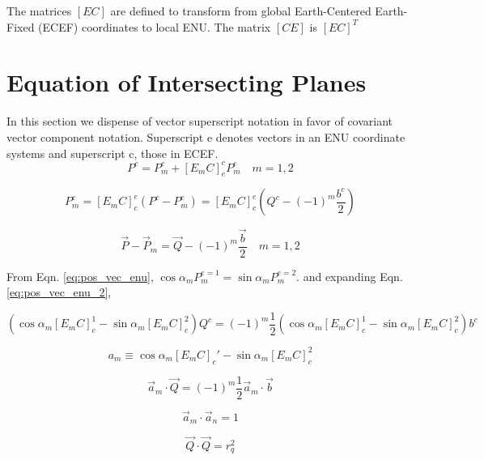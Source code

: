 \documentclass[12pt]{article}
\begin{document}
	The matrices $[EC]$ are defined to transform from global Earth-Centered Earth-Fixed (ECEF) coordinates to local
	ENU. The matrix $[CE]$ is $[EC]^T$
	
	\section{Equation of Intersecting Planes}
	In this section we dispense of vector superscript notation in favor of covariant vector component notation. Superscript e denotes vectors in an ENU coordinate systems and superscript c, those in ECEF.
	\begin{equation}
	P^c = P_m^c + \left[ E_m C \right]_e^c P_m^e  \quad m = 1, 2
	\end{equation}
	
	\begin{equation}
	P_m^e = \left[ E_m C \right]_c^e \left( P^c - P_m^c \right) = \left[ E_m C \right]_c^e \left( Q^c - (-1)^m \frac{b^c}{2} \right)
	\label{eq:pos_vec_enu_2}
	\end{equation}
	
	\begin{equation}
	\vec{P} - \vec{P}_m = \vec{Q} - (-1)^m \frac{\vec{b}}{2} \quad m = 1, 2
	\end{equation}
	
	From Eqn. \ref{eq:pos_vec_enu},
	$
	\cos\alpha_m P_m^{e=1} = \sin\alpha_m P_m^{e=2}.
	$
	and expanding Eqn. \ref{eq:pos_vec_enu_2},
	
	\begin{equation}
		\left( \cos\alpha_m \left[ E_m C \right]_c^1 - \sin\alpha_m \left[ E_m C \right]_c^2 \right) Q^c = 
		 (-1)^{m} \frac{1}{2} \left( \cos\alpha_m \left[ E_m C \right]_c^1 - \sin\alpha_m \left[ E_m C \right]_c^2 \right) b^c
	\end{equation}
	
	\begin{equation}
	a_m \equiv \cos \alpha_m \left[ E_m C \right]_c' - \sin \alpha_m \left[ E_m C \right]_c^2
	\end{equation}
	
	\begin{equation}
	\vec{a}_m \cdot \vec{Q} = (-1)^m \frac{1}{2} \vec{a}_m \cdot \vec{b}
	\end{equation}
	
	\begin{equation}
	\vec{a}_m \cdot \vec{a}_n = 1
	\end{equation}
	
	\begin{equation}
	\vec{Q} \cdot \vec{Q} = r_q^2
	\end{equation}
	
\end{document}

